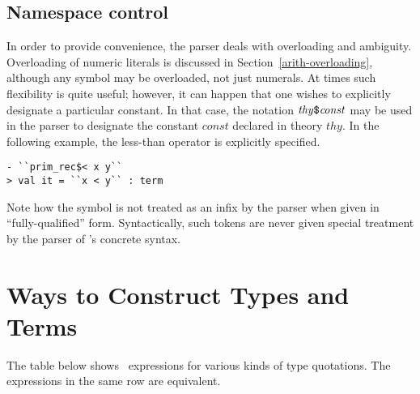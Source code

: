 \subsection{Namespace control}

In order to provide convenience, the parser deals with overloading and
ambiguity. Overloading of numeric literals is discussed in
Section~\ref{arith-overloading}, although any symbol may be
overloaded, not just numerals. At times such flexibility is quite
useful; however, it can happen that one wishes to explicitly designate
a particular constant. In that case, the notation
$\mathit{thy}\holtxt{\$}\mathit{const}$ may be used in the parser to
designate the constant $\mathit{const}$ declared in theory
$\mathit{thy}$. In the following example, the less-than operator is
explicitly specified.

\setcounter{sessioncount}{0}
\begin{session}
\begin{verbatim}
- ``prim_rec$< x y``
> val it = ``x < y`` : term
\end{verbatim}
\end{session}
Note how the \holtxt{<} symbol is not treated as an infix by the
parser when given in ``fully-qualified'' form.  Syntactically, such
tokens are never given special treatment by the parser of \HOL's
concrete syntax.
%

\section{Ways to Construct Types and Terms}

The table below shows \ML\ expressions for various kinds of type
quotations.
The expressions in the same row are equivalent.

\bigskip

